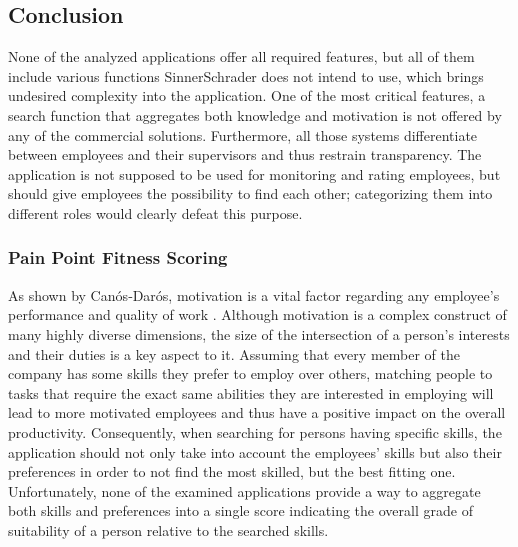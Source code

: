 \newpage

\subsection{Conclusion}
None of the analyzed applications offer all required features, but all of them include various functions SinnerSchrader does not intend to use, which brings undesired complexity into the application.
One of the most critical features, a search function that aggregates both knowledge and motivation is not offered by any of the commercial solutions.
Furthermore, all those systems differentiate between employees and their supervisors and thus restrain transparency. The application is not supposed to be used for monitoring and rating employees, but should give employees the possibility to find each other; categorizing them into different roles would clearly defeat this purpose.

\subsubsection{Pain Point Fitness Scoring}
As shown by Canós‐Darós, motivation is a vital factor regarding any employee's performance and quality of work \cite{CanosDaros2013}.
Although motivation is a complex construct of many highly diverse dimensions, the size of the intersection of a person's interests and their duties is a key aspect to it. Assuming that every member of the company has some skills they prefer to employ over others, matching people to tasks that require the exact same abilities they are interested in employing will lead to more motivated employees and thus have a positive impact on the overall productivity.
Consequently, when searching for persons having specific skills, the application should not only take into account the employees' skills but also their preferences in order to not find the most skilled, but the best fitting one. Unfortunately, none of the examined applications provide a way to aggregate both skills and preferences into a single score indicating the overall grade of suitability of a person relative to the searched skills.

